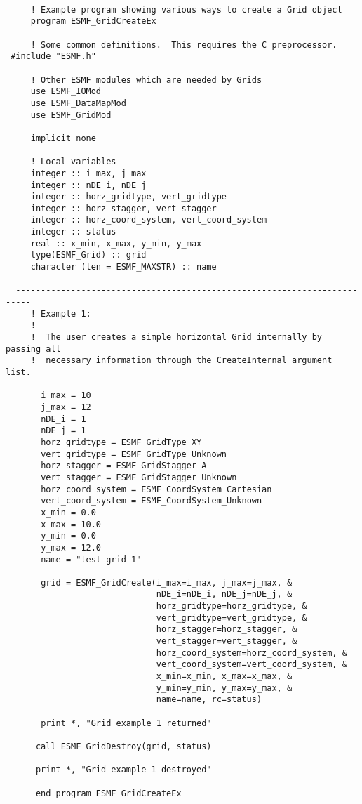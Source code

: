   
  \begin{verbatim}
 
     ! Example program showing various ways to create a Grid object
     program ESMF_GridCreateEx
     
     ! Some common definitions.  This requires the C preprocessor.
 #include "ESMF.h"
 
     ! Other ESMF modules which are needed by Grids
     use ESMF_IOMod
     use ESMF_DataMapMod
     use ESMF_GridMod
     
     implicit none
     
     ! Local variables
     integer :: i_max, j_max
     integer :: nDE_i, nDE_j
     integer :: horz_gridtype, vert_gridtype
     integer :: horz_stagger, vert_stagger
     integer :: horz_coord_system, vert_coord_system
     integer :: status
     real :: x_min, x_max, y_min, y_max
     type(ESMF_Grid) :: grid
     character (len = ESMF_MAXSTR) :: name
         
  -------------------------------------------------------------------------
     ! Example 1:
     !
     !  The user creates a simple horizontal Grid internally by passing all
     !  necessary information through the CreateInternal argument list.
 
       i_max = 10
       j_max = 12
       nDE_i = 1
       nDE_j = 1
       horz_gridtype = ESMF_GridType_XY
       vert_gridtype = ESMF_GridType_Unknown
       horz_stagger = ESMF_GridStagger_A
       vert_stagger = ESMF_GridStagger_Unknown
       horz_coord_system = ESMF_CoordSystem_Cartesian
       vert_coord_system = ESMF_CoordSystem_Unknown
       x_min = 0.0
       x_max = 10.0
       y_min = 0.0
       y_max = 12.0
       name = "test grid 1"
  
       grid = ESMF_GridCreate(i_max=i_max, j_max=j_max, &
                              nDE_i=nDE_i, nDE_j=nDE_j, &
                              horz_gridtype=horz_gridtype, &
                              vert_gridtype=vert_gridtype, &
                              horz_stagger=horz_stagger, &
                              vert_stagger=vert_stagger, &
                              horz_coord_system=horz_coord_system, &
                              vert_coord_system=vert_coord_system, &
                              x_min=x_min, x_max=x_max, &
                              y_min=y_min, y_max=y_max, &
                              name=name, rc=status)
 
       print *, "Grid example 1 returned"
 
      call ESMF_GridDestroy(grid, status)
 
      print *, "Grid example 1 destroyed"
 
      end program ESMF_GridCreateEx
     
  \end{verbatim}
     
